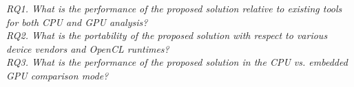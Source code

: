 \textit{RQ1. What is the performance of the proposed solution relative to existing tools for both CPU and GPU analysis?}\\

\textit{RQ2. What is the portability of the proposed solution with respect to various device vendors and OpenCL runtimes?}\\

\textit{RQ3. What is the performance of the proposed solution in the CPU vs. embedded GPU comparison mode?}\\


